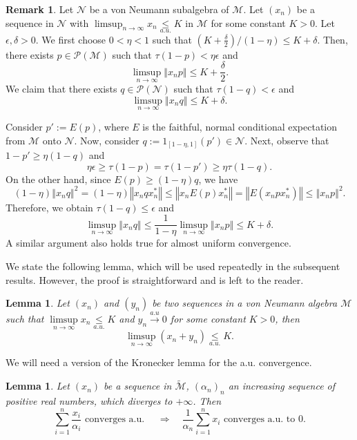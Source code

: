 \documentclass[10pt]{amsart}
\newtheorem{lem}[thm]{Lemma}
\theoremstyle{definition}
\theoremstyle{myremark}
\newtheorem{rem}[thm]{Remark}
\numberwithin{equation}{section}
\newcommand{\CM}{\mathcal{M}}
\newcommand{\CN}{\mathcal{N}}
\newcommand{\CP}{\mathcal{P}}
\newcommand{\norm}[1]{\left\Vert#1\right\Vert}
\newcommand{\auleq}{\underset{a.u.}{\leq }}
\begin{document}
\begin{rem}\label{rem: indep of ambient vna}
Let $\CN$ be a von Neumann subalgebra of $\CM$. Let $(x_n)$ be a sequence in $\CN$ with $\limsup_{n \to \infty} x_n \auleq K $ in $\CM$ for some constant $K>0$. Let $\epsilon, \delta>0$. We first choose $0< \eta <1$ such that $(K+ \frac{\delta}{2})/ (1-\eta) \leq K+ \delta$. Then, there exists $p \in \CP(\CM)$ such that $\tau(1-p)< \eta \epsilon$ and 
\[
\limsup_{n \to \infty} \norm{x_np} \leq K + \frac{\delta}{2}.
\]
We claim that there exists $q \in \CP(\CN)$ such that $\tau(1-q)< \epsilon$ and 
\[
\limsup_{n \to \infty} \norm{x_nq} \leq K + \delta.
\]


Consider $p':= E(p)$, where $E$ is the faithful, normal conditional expectation from $\CM$ onto $\CN$. Now, consider $q:= 1_{[1-\eta, 1]}(p')\in \CN$. Next, observe that $1- p' \geq \eta (1-q)$ and
\[
\eta \epsilon \geq \tau(1-p)= \tau(1-p') \geq \eta \tau(1-q).
\]
On the other hand, since $E(p)\geq (1-\eta) q$, we have \[
(1-\eta)\norm{x_nq}^2=(1-\eta)\norm{x_nqx_n^*} \leq  \norm{x_n E(p) x_n^*}=\norm{E(x_n p x_n^*)} \leq  \norm{x_np}^2.
\]
Therefore, we obtain $\tau(1-q) \leq \epsilon$ and
\[
\limsup_{n \to \infty} \norm{x_nq} \leq \frac{1}{1-\eta} \limsup_{n \to \infty} \norm{x_np} \leq K+ \delta.
\]
A similar argument also holds true for almost uniform convergence.
\end{rem}


We state the following lemma, which will be used repeatedly in the subsequent results. However, the proof is straightforward and is left to the reader.


\begin{lem}\label{lem: au convergence and bounded lemma}
    Let $(x_n)$ and $(y_n)$ be two sequences in a von Neumann algebra $\CM$ such that $\limsup\limits_{n \to \infty} x_n \auleq K$ and $y_n\xrightarrow{a.u} 0$ for some constant $K>0$, then $$\limsup_{n \to \infty} \left(x_n+y_n\right) \auleq K.$$
\end{lem}


 We will need a version of the Kronecker lemma for the a.u. convergence.
   \begin{lem}\label{lem: Kronecker2}
    Let $(x_n)$ be a sequence in $\widetilde{\CM}$, $(\alpha_n)_n$ an increasing sequence of positive real numbers, which diverges to $+\infty$. Then
    $$
    \sum_{i=1}^n \frac{x_i}{\alpha_i} \text{ converges a.u. }  
    \quad \Rightarrow \quad 
     \frac{1}{\alpha_n} \sum_{i=1}^n x_i  \text{ converges a.u. to }   0.
     $$
       \end{lem}
\end{document}
